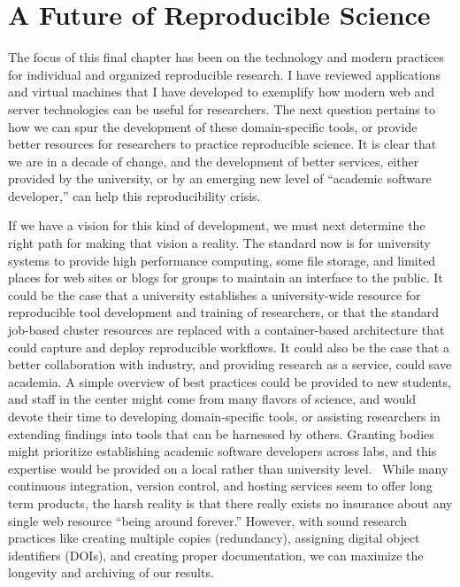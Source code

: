 \documentclass{report}
\begin{document}
\section{A Future of Reproducible Science}

The focus of this final chapter has been on the technology and modern
practices for individual and organized reproducible research. I have
reviewed applications and virtual machines that I have developed to
exemplify how modern web and server technologies can be useful for
researchers. The next question pertains to how we can spur the
development of these domain-specific tools, or provide better resources
for researchers to practice reproducible science. It is clear that we
are in a decade of change, and the development of better services,
either provided by the university, or by an emerging new level of
``academic software developer,'' can help this reproducibility crisis.

If we have a vision for this kind of development, we must next determine
the right path for making that vision a reality. The standard now is for
university systems to provide high performance computing, some file
storage, and limited places for web sites or blogs for groups to
maintain an interface to the public. It could be the case that a
university establishes a university-wide resource for reproducible tool
development and training of researchers, or that the standard job-based
cluster resources are replaced with a container-based architecture that
could capture and deploy reproducible workflows. It could also be the
case that a better collaboration with industry, and providing research
as a service, could save academia. A simple overview of best practices
could be provided to new students, and staff in the center might come
from many flavors of science, and would devote their time to developing
domain-specific tools, or assisting researchers in extending findings
into tools that can be harnessed by others. Granting bodies might
prioritize establishing academic software developers across labs, and
this expertise would be provided on a local rather than university
level. ~While many continuous integration, version control, and hosting
services seem to offer long term products, the harsh reality is that
there really exists no insurance about any single web resource ``being
around forever.'' However, with sound research practices like creating
multiple copies (redundancy), assigning digital object identifiers
(DOIs), and creating proper documentation, we can maximize the longevity
and archiving of our results.




\end{document}

